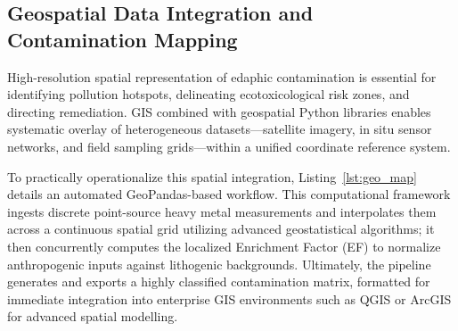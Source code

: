 \documentclass[environremediat,article,accept,pdftex,oneauthor]{Definitions/mdpi}
\begin{document}
\subsection{Geospatial Data Integration and Contamination Mapping}\label{sec2.3}

{High-resolution spatial representation of edaphic contamination is essential for identifying pollution hotspots, delineating ecotoxicological risk zones, and directing remediation. GIS combined with geospatial Python libraries enables systematic overlay of heterogeneous datasets---satellite imagery, in situ sensor networks, and field sampling grids---within a unified coordinate reference system.} 

To practically operationalize this spatial integration, Listing~\ref{lst:geo_map} details an automated GeoPandas-based workflow. This computational framework ingests discrete point-source heavy metal measurements and interpolates them across a continuous spatial grid utilizing advanced geostatistical algorithms; it then concurrently computes the localized Enrichment Factor (EF) to normalize anthropogenic inputs against lithogenic backgrounds. Ultimately, the pipeline generates and exports a highly classified contamination matrix, formatted for immediate integration into enterprise GIS environments such as QGIS or ArcGIS for advanced spatial modelling.
\end{document}
